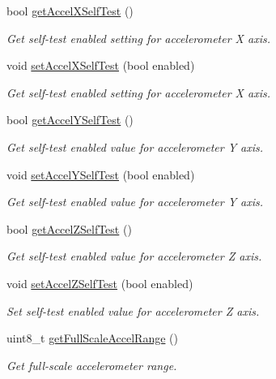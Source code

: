 \begin{DoxyCompactItemize}
bool \mbox{\hyperlink{classMPU6050_a8fc7eab1302281f6e4bc953379f3237b}{get\+Accel\+X\+Self\+Test}} ()
\begin{DoxyCompactList}\small\item\em Get self-\/test enabled setting for accelerometer X axis. \end{DoxyCompactList}\item 
void \mbox{\hyperlink{classMPU6050_ac2ab843dc9d241056ed0f891195cdbf9}{set\+Accel\+X\+Self\+Test}} (bool enabled)
\begin{DoxyCompactList}\small\item\em Get self-\/test enabled setting for accelerometer X axis. \end{DoxyCompactList}\item 
bool \mbox{\hyperlink{classMPU6050_a2523e798db3baf9cb9dbf347af16639b}{get\+Accel\+Y\+Self\+Test}} ()
\begin{DoxyCompactList}\small\item\em Get self-\/test enabled value for accelerometer Y axis. \end{DoxyCompactList}\item 
void \mbox{\hyperlink{classMPU6050_ad5847430ab297959e4d0e9b81ba2e3ba}{set\+Accel\+Y\+Self\+Test}} (bool enabled)
\begin{DoxyCompactList}\small\item\em Get self-\/test enabled value for accelerometer Y axis. \end{DoxyCompactList}\item 
bool \mbox{\hyperlink{classMPU6050_a57710638eeb6176cf14a8c444bda5300}{get\+Accel\+Z\+Self\+Test}} ()
\begin{DoxyCompactList}\small\item\em Get self-\/test enabled value for accelerometer Z axis. \end{DoxyCompactList}\item 
void \mbox{\hyperlink{classMPU6050_a8eb8ba039af9a47e0475a3835b87f404}{set\+Accel\+Z\+Self\+Test}} (bool enabled)
\begin{DoxyCompactList}\small\item\em Set self-\/test enabled value for accelerometer Z axis. \end{DoxyCompactList}\item 
uint8\+\_\+t \mbox{\hyperlink{classMPU6050_a0fe2dad60c170cee7d614e08f243ffd0}{get\+Full\+Scale\+Accel\+Range}} ()
\begin{DoxyCompactList}\small\item\em Get full-\/scale accelerometer range. \end{DoxyCompactList}\item 

\end{DoxyCompactItemize}
